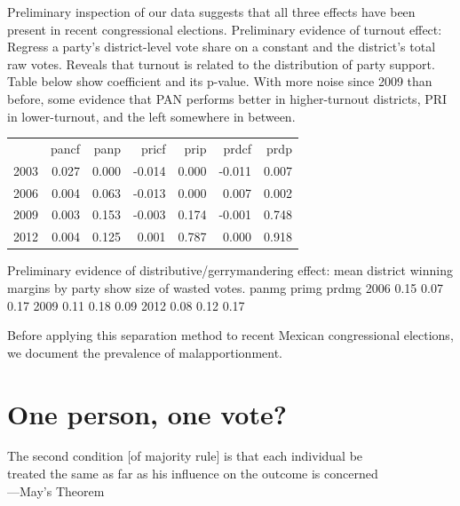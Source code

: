 \documentclass[letter,12pt]{article}
\begin{document}
Preliminary inspection of our data suggests that all three effects have been present in recent congressional elections. Preliminary evidence of turnout effect: Regress a party's district-level vote share on a constant and the district's total raw votes. Reveals that turnout is related to the distribution of party support. Table below show coefficient and its p-value. With more noise since 2009 than before, some evidence that PAN performs better in higher-turnout districts, PRI in lower-turnout, and the left somewhere in between. 
\begin{tabular}{rrrrrrr}
      & pancf &  panp &  pricf &  prip &  prdcf &  prdp \\
 2003 & 0.027 & 0.000 & -0.014 & 0.000 & -0.011 & 0.007 \\
 2006 & 0.004 & 0.063 & -0.013 & 0.000 &  0.007 & 0.002 \\
 2009 & 0.003 & 0.153 & -0.003 & 0.174 & -0.001 & 0.748 \\
 2012 & 0.004 & 0.125 &  0.001 & 0.787 &  0.000 & 0.918 \\
\end{tabular}
Preliminary evidence of distributive/gerrymandering effect: mean district winning margins by party show size of wasted votes. 
      panmg primg prdmg
 2006  0.15  0.07  0.17
 2009  0.11  0.18  0.09
 2012  0.08  0.12  0.17

Before applying this separation method to recent Mexican congressional elections, we document the prevalence of malapportionment. 


\section{One person, one vote?}

\singlespacing
\begin{footnotesize}
\begin{center}
The second condition [of majority rule] is that each individual be \\ treated the same as far as his influence on the outcome is concerned \\ ---May's Theorem \citeyearpar{may.1952condsMaj}
\end{center}
\end{footnotesize}
\onehalfspacing
\end{document}
